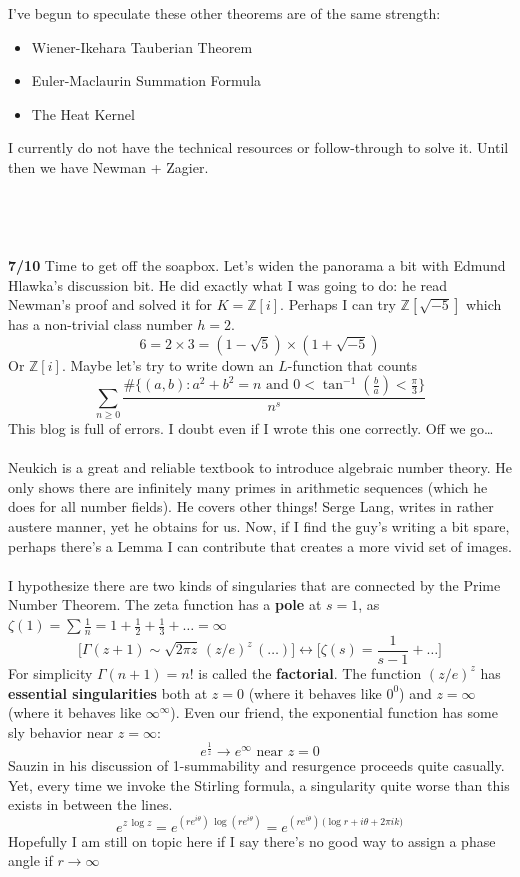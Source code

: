 \documentclass[12pt]{article}
\begin{document}
\noindent I've begun to speculate these other theorems are of the same strength:
\begin{itemize}
\item Wiener-Ikehara Tauberian Theorem
\item Euler-Maclaurin Summation Formula
\item The Heat Kernel
\end{itemize}
I currently do not have the technical resources or follow-through to solve it.  Until then we have Newman + Zagier. \\ \\ \\ \\ \\
\textbf{7/10} Time to get off the soapbox. Let's widen the panorama a bit with Edmund Hlawka's discussion bit.  He did exactly what I was going to do: he read Newman's proof and solved it for $K = \mathbb{Z}[i]$.  Perhaps I can try $\mathbb{Z}[\sqrt{-5}]$ which has a non-trivial class number $h = 2$.
$$ 6 = 2 \times 3 = (1 - \sqrt{5}) \times (1 + \sqrt{-5}) $$ 
Or $\mathbb{Z}[i]$. Maybe let's try to write down an $L$-function that counts 
$$ \sum_{n \geq 0} \frac{ \# \Big\{ (a,b): a^2 + b^2 = n \text{ and } 0 < \tan^{-1}( \frac{b}{a}) < \frac{\pi}{3} \Big\} }{ n^s } $$
This blog is full of errors.  I doubt even if I wrote this one correctly.  Off we go\dots \\ \\
Neukich is a great and reliable textbook to introduce algebraic number theory. He only shows there are infinitely many primes in arithmetic sequences (which he does for all number fields).   He covers other things! Serge Lang, writes in rather austere manner, yet he obtains for us.  Now, if I find the guy's writing a bit spare, perhaps there's a Lemma I can contribute that creates a more vivid set of images. \\ \\
I hypothesize there are two kinds of singularies that are connected by the Prime Number Theorem.  The zeta function has a \textbf{pole} at $s = 1$, as $\zeta(1) =  \sum \frac{1}{n} = 1 + \frac{1}{2} + \frac{1}{3} + \dots = \infty $
$$ \Bigg[ \Gamma(z+1) \sim \sqrt{2\pi z} \, (z/e)^z \, (\dots) \Bigg] \leftrightarrow \Bigg[ \zeta(s) = \frac{1}{s-1} + \dots  \Bigg] $$
For simplicity $\Gamma(n+1)=n!$ is called the \textbf{factorial}.  The function $(z/e)^z$ has \textbf{essential singularities} both at $z = 0$ (where it behaves like $0^0$) and $z = \infty$ (where it behaves like $\infty^\infty$).  Even our friend, the exponential function has some sly behavior near $z = \infty$:
$$ e^{\frac{1}{z}} \to e^\infty \text{ near }z=0 $$
Sauzin in his discussion of 1-summability and resurgence proceeds quite casually.  Yet, every time we invoke the Stirling formula, a singularity quite worse than this exists in between the lines.
$$ e^{z \, \log z  } = e^{ (re^{i\theta}) \, \log (re^{i\theta}) } 
= e^{ (re^{i\theta}) \, \big( \log r + i\theta + 2\pi i k \big) }  $$
Hopefully I am still on topic here if I say there's no good way to assign a phase angle if $r \to \infty$
\end{document}
